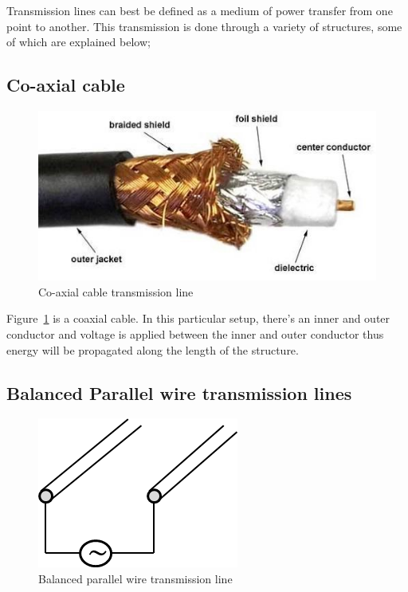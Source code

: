 Transmission lines can best be defined as a medium of power transfer from one point to another. This transmission is done through a variety of structures, some of which are explained below;

\subsection{Co-axial cable}
\begin{figure}[h]
\centering
\includegraphics[scale=0.65]{graphics/coaxial}
\caption{Co-axial cable transmission line}
\label{fig:coaxial}
\end{figure}

Figure~\ref{fig:coaxial} is a coaxial cable. In this particular setup, there’s an inner and outer conductor and voltage is applied between the inner and outer conductor thus energy will be propagated along the length of the structure.

\subsection{Balanced Parallel wire transmission lines}
\begin{figure}[h]
\centering
\includegraphics[width=0.5\linewidth]{graphics/parallel_wire_tx_simp}
\caption{Balanced parallel wire transmission line}
\label{fig:twowire}
\end{figure}


